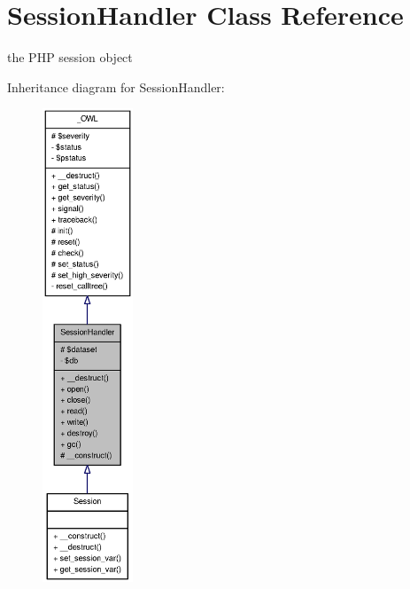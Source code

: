 \section{SessionHandler Class Reference}
\label{classSessionHandler}


the PHP session object  




Inheritance diagram for SessionHandler:\nopagebreak
\begin{figure}[H]
\begin{center}
\leavevmode
\includegraphics[height=400pt]{classSessionHandler__inherit__graph}
\end{center}
\end{figure}



